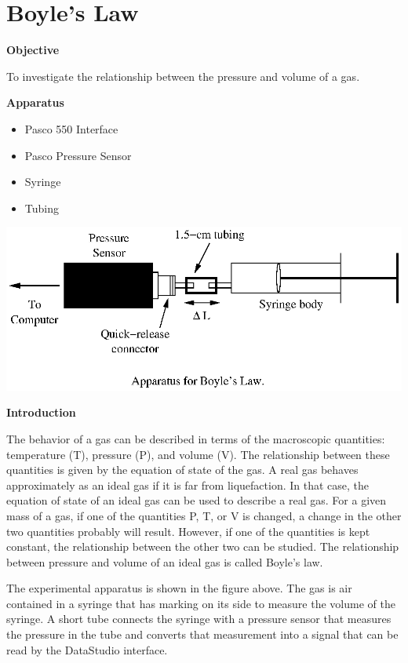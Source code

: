 
\section{Boyle's Law}

\makelabheader %

\textbf{Objective}

To investigate the relationship between the pressure and volume of
a gas.

\textbf{Apparatus}

\begin{itemize}
\item Pasco 550 Interface
\item Pasco Pressure Sensor
\item Syringe
\item Tubing
\end{itemize}
\vspace{0.3cm}
{\par\centering \includegraphics{boyles_law/boyleslawfig1.eps} \par}
\vspace{0.3cm}

\textbf{Introduction}

The behavior of a gas can be described in terms of the macroscopic quantities:
temperature (T), pressure (P), and volume (V). The relationship between these
quantities is given by the equation of state of the gas. A real gas behaves
approximately as an ideal gas if it is far from liquefaction. In that case,
the equation of state of an ideal gas can be used to describe a real gas. For
a given mass of a gas, if one of the quantities P, T, or V is changed, a change
in the other two quantities probably will result. However, if one of the quantities
is kept constant, the relationship between the other two can be studied. The
relationship between pressure and volume of an ideal gas is called Boyle's law.

The experimental apparatus is shown in the figure above. The gas is air contained
in a syringe that has marking on its side to measure the volume of the syringe.
A short tube connects the syringe with a pressure sensor that measures the pressure
in the tube and converts that measurement into a signal that can be read by
the DataStudio interface.

